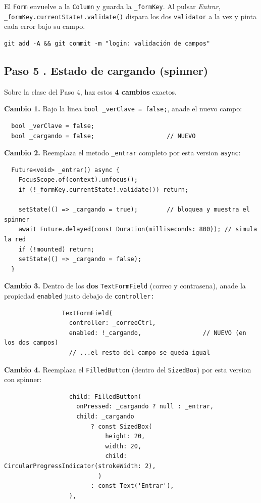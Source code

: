 \documentclass[11pt,a4paper,oneside]{book}
\begin{document}
\begin{whatbox}
El \texttt{Form} envuelve a la \texttt{Column} y guarda la \texttt{\_formKey}. Al pulsar
\emph{Entrar}, \texttt{\_formKey.currentState!.validate()} dispara los dos
\texttt{validator} a la vez y pinta cada error bajo su campo.
\end{whatbox}

\begin{lstlisting}[language={},numbers=none]
git add -A && git commit -m "login: validación de campos"
\end{lstlisting}

\subsection*{Paso 5 . Estado de cargando (spinner)}
Sobre la clase del Paso 4, haz estos \textbf{4 cambios} exactos.

\vspace{4pt}
\noindent\textbf{Cambio 1.} Bajo la linea \texttt{bool \_verClave = false;}, anade el
nuevo campo:
\begin{lstlisting}
  bool _verClave = false;
  bool _cargando = false;                    // NUEVO
\end{lstlisting}

\noindent\textbf{Cambio 2.} Reemplaza el metodo \texttt{\_entrar} completo por esta
version \texttt{async}:
\begin{lstlisting}
  Future<void> _entrar() async {
    FocusScope.of(context).unfocus();
    if (!_formKey.currentState!.validate()) return;

    setState(() => _cargando = true);        // bloquea y muestra el spinner
    await Future.delayed(const Duration(milliseconds: 800)); // simula la red
    if (!mounted) return;
    setState(() => _cargando = false);
  }
\end{lstlisting}

\noindent\textbf{Cambio 3.} Dentro de los \textbf{dos} \texttt{TextFormField} (correo y
contrasena), anade la propiedad \texttt{enabled} justo debajo de \texttt{controller:}
\begin{lstlisting}
                TextFormField(
                  controller: _correoCtrl,
                  enabled: !_cargando,                 // NUEVO (en los dos campos)
                  // ...el resto del campo se queda igual
\end{lstlisting}

\noindent\textbf{Cambio 4.} Reemplaza el \texttt{FilledButton} (dentro del
\texttt{SizedBox}) por esta version con spinner:
\begin{lstlisting}
                  child: FilledButton(
                    onPressed: _cargando ? null : _entrar,
                    child: _cargando
                        ? const SizedBox(
                            height: 20,
                            width: 20,
                            child: CircularProgressIndicator(strokeWidth: 2),
                          )
                        : const Text('Entrar'),
                  ),
\end{lstlisting}
\end{document}
